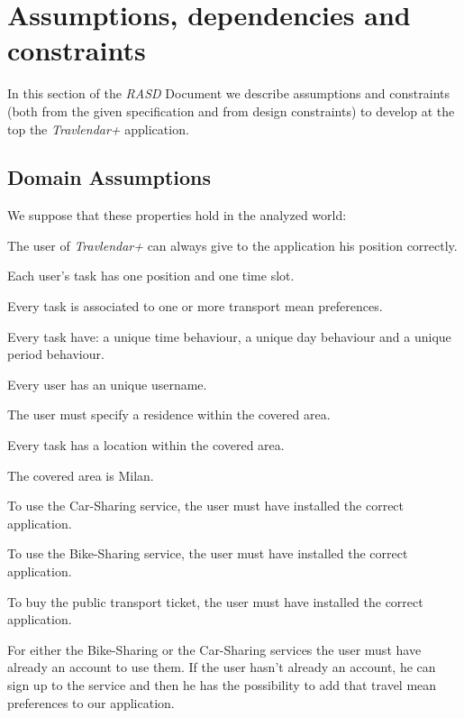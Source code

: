 \section{Assumptions, dependencies and constraints}
In this section of the \emph{RASD} Document we describe assumptions and constraints (both from the given specification and from design constraints) to develop at the top the \emph{Travlendar+} application.

\subsection{Domain Assumptions}
We suppose that these properties hold in the analyzed world:
\begin{domainList}

\item The user of \emph{Travlendar+} can always give to the application his position correctly.

\item Each user's task has one position and one time slot.

\item Every task is associated to one or more transport mean preferences.

\item Every task have: a unique time behaviour, a unique day behaviour and a unique period behaviour.

\item Every user has an unique username.

\item The user must specify a residence within the covered area.

\item Every task has a location within the covered area.

\item The covered area is Milan.

\item To use the Car-Sharing service, the user must have installed the correct application.

\item To use the Bike-Sharing service, the user must have installed the correct application.

\item To buy the public transport ticket, the user must have installed the correct application.

\item For either the Bike-Sharing or the Car-Sharing services the user must have already an account to use them. If the user hasn't already an account, he can sign up to the service and then he has the possibility to add that travel mean preferences to our application.


\end{domainList}
